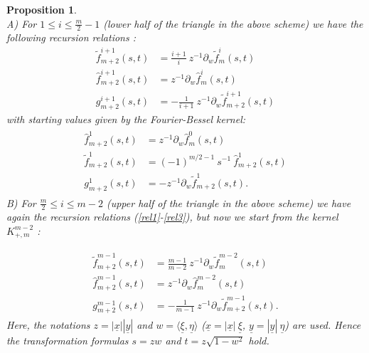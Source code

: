 \documentclass{amsart}
\newtheorem{proposition}[theorem]{Proposition}
\theoremstyle{remark}
\begin{document}
 
\begin{proposition}~\\
A) For $1 \leq i \leq \frac{m}{2} - 1$ (lower half of the triangle in the above scheme) we have the following recursion relations :
\begin{align}
\label{rel1}
\tilde{f}_{m+2}^{i+1}(s,t) &= \frac{i+1}{i} \ z^{-1} \partial_w \tilde{f}_m^i(s,t)\\
\label{rel2}
\hat{f}_{m+2}^{i+1}(s,t) &=   z^{-1} \partial_w \hat{f}_m^i(s,t) \\
\label{rel3}
g^{i+1}_{m+2}(s,t) &=  - \frac{1}{i+1} \ z^{-1} \partial_w \tilde{f}_{m+2}^{i+1}(s,t)
\end{align}
with starting values given by the Fourier-Bessel kernel:
\begin{align}\label{rec1}
\begin{split}
\hat{f}^1_{m+2}(s,t) &=  z^{-1} \partial_w \hat{f}_m^0(s,t)\\
\tilde{f}^1_{m+2}(s,t)  &=  (-1)^{m/2-1} \ s^{-1} \ \hat{f}^1_{m+2}(s,t)\\
g^1_{m+2}(s,t)  &=  - z^{-1} \partial_w \tilde{f}^1_{m+2}(s,t)  .
\end{split}
\end{align}
B) For $\frac{m}{2} \leq i \leq m-2$ (upper half of the triangle in the above scheme) we have again the recursion relations (\ref{rel1}-\ref{rel3}), but now we start from the kernel $K_{+,m}^{m-2}$ :

\begin{align}\label{rec2}
\begin{split}
\tilde{f}_{m+2}^{m-1}(s,t)  &=  \frac{m-1}{m-2} \ z^{-1} \partial_w \tilde{f}_m^{m-2}(s,t)\\
\hat{f}_{m+2}^{m-1}(s,t)  &=   z^{-1} \partial_w \hat{f}_m^{m-2}(s,t) \\
g^{m-1}_{m+2}(s,t)  &=  - \frac{1}{m-1} \ z^{-1} \partial_w \tilde{f}_{m+2}^{m-1}(s,t)  .
\end{split}
\end{align}
Here, the notations $z=|{\underline{x}} |  |{\underline{y}}|$ and $w = \langle \underline{\xi} , \underline{\eta} \rangle$ (${\underline{x}} = |{\underline{x}} | \ \underline{\xi}$, ${\underline{y}} = |{\underline{y}}| \ \underline{\eta}$) are used. Hence the transformation formulas $s = z w $ and $t=z \sqrt{1-w^2}$ hold.
\end{proposition}
\end{document}
